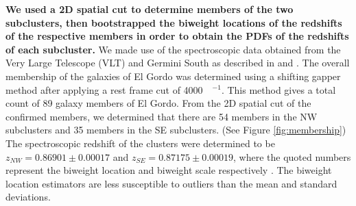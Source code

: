 

\textbf{We used a 2D spatial cut to determine members of the two
subclusters, then bootstrapped the biweight locations of the redshifts of the
respective members in order to obtain the PDFs of the redshifts of each
subcluster.} We made use of the spectroscopic data
obtained from the Very Large Telescope (VLT) and Germini South as described
in  and \citet{Sifon13}. The overall membership of the galaxies
of El Gordo was determined using a shifting gapper method after applying a
rest frame cut of 4000~\kilo\meter~\second$^{-1}$. This method gives a
total count of 89 galaxy members of El Gordo. From the 2D spatial cut of
the confirmed members, we determined that there are 54 members in the NW
subclusters and 35 members in the SE subclusters. (See Figure
\ref{fig:membership}) The spectroscopic redshift of the clusters were
determined to be $z_{NW} = 0.86901 \pm 0.00017$ and $z_{SE} = 0.87175 \pm
0.00019$, where the quoted numbers represent the biweight location and
biweight scale respectively \citep{Beers90}. The biweight location
estimators are less susceptible to outliers than the mean and standard
deviations. 

%
